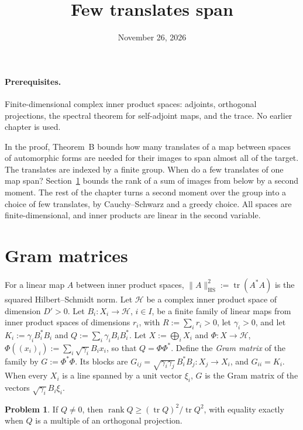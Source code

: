 \documentclass[reqno]{amsart}
\title{Few translates span}
\author{}
\date{November 26, 2026}
\newcounter{chap}
\numberwithin{equation}{section}
\theoremstyle{definition}
\newtheorem{problem}{Problem}[section]
\theoremstyle{plain}
\theoremstyle{remark}
\newcommand{\Hc}{\mathcal{H}}
\newcommand{\tr}{\operatorname{tr}}
\newcommand{\rank}{\operatorname{rank}}
\newcommand{\HS}{\mathrm{HS}}
\begin{document}
\maketitle
{}\label{chap}

\paragraph{Prerequisites.}
Finite-dimensional complex inner product spaces: adjoints, orthogonal projections, the spectral theorem for self-adjoint maps, and the trace.  No earlier chapter is used.

In the proof, Theorem~B bounds how many translates of a map between spaces of automorphic forms are needed for their images to span almost all of the target.  The translates are indexed by a finite group.  When do a few translates of one map span?  Section~\ref{sec:gram} bounds the rank of a sum of images from below by a second moment.  The rest of the chapter turns a second moment over the group into a choice of few translates, by Cauchy--Schwarz and a greedy choice.  All spaces are finite-dimensional, and inner products are linear in the second variable.

\section{Gram matrices}\label{sec:gram}

For a linear map \(A\) between inner product spaces, \(\lVert A \rVert_\HS^2 := \tr(A^*A)\) is the squared Hilbert--Schmidt norm.  Let \(\Hc\) be a complex inner product space of dimension \(D' > 0\).  Let \(B_i \colon X_i \to \Hc\), \(i \in I\), be a finite family of linear maps from inner product spaces of dimensions \(r_i\), with \(R := \sum_i r_i > 0\), let \(\gamma_i > 0\), and let \(K_i := \gamma_i B_i^* B_i\) and \(Q := \sum_i \gamma_i B_i B_i^*\).  Let \(X := \bigoplus_i X_i\) and \(\Phi \colon X \to \Hc\), \(\Phi((x_i)_i) := \sum_i \sqrt{\gamma_i} B_i x_i\), so that \(Q = \Phi\Phi^*\).  Define the \emph{Gram matrix} of the family by \(G := \Phi^*\Phi\).  Its blocks are \(G_{ij} = \sqrt{\gamma_i\gamma_j}\, B_i^* B_j \colon X_j \to X_i\), and \(G_{ii} = K_i\).  When every \(X_i\) is a line spanned by a unit vector \(\xi_i\), \(G\) is the Gram matrix of the vectors \(\sqrt{\gamma_i} B_i \xi_i\).

\begin{problem}\label{pr:rank-trace}
If \(Q \ne 0\), then \(\rank Q \ge (\tr Q)^2/\tr Q^2\), with equality exactly when \(Q\) is a multiple of an orthogonal projection.
\end{problem}
\end{document}
